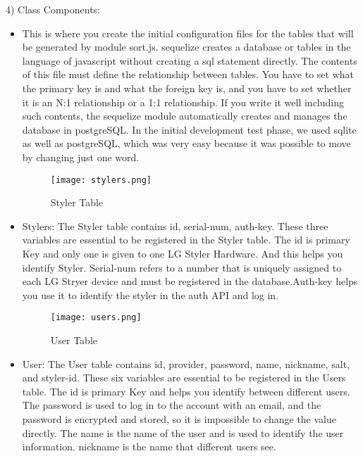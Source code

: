 \documentclass[conference]{IEEEtran}
\begin{document}
4) Class Components:
\newpage
\begin{itemize}

    \item This is where you create the initial configuration files for the tables that will be generated by module sort.js. sequelize creates a database or tables in the language of javascript without creating a sql statement directly. The contents of this file must define the relationship between tables. You have to set what the primary key is and what the foreign key is, and you have to set whether it is an N:1 relationship or a 1:1 relationship. If you write it well including such contents, the sequelize module automatically creates and manages the database in postgreSQL. In the initial development test phase, we used sqlite as well as postgreSQL, which was very easy because it was possible to move by changing just one word.\\

    \begin{figure}[htbp]
    \centerline{\texttt{[image: stylers.png]}}
    \label{fig}
    \caption{Styler Table}
    \end{figure}
    \item Stylers: The Styler table contains id, serial-num, auth-key. These three variables are essential to be registered in the Styler table. The id is primary Key and only one is given to one LG Styler Hardware. And this helps you identify Styler. Serial-num refers to a number that is uniquely assigned to each LG Stryer device and must be registered in the database.Auth-key helps you use it to identify the styler in the auth API and log in.\\
    
    \begin{figure}[htbp]
    \centerline{\texttt{[image: users.png]}}
    \label{fig}
    \caption{User Table}
    \end{figure}
    \item User: The User table contains id, provider, password, name, nickname, salt, and styler-id. These six variables are essential to be registered in the Users table. The id is primary Key and helps you identify between different users. The password is used to log in to the account with an email, and the password is encrypted and stored, so it is impossible to change the value directly. The name is the name of the user and is used to identify the user information. nickname is the name that different users see.\\
    

\end{itemize}
\end{document}
